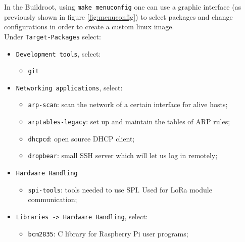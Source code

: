 In the Buildroot, using \verb|make menuconfig| one can use a graphic interface (as previously shown in figure \ref{fig:menuconfig}) to select packages and change configurations in order to create a custom linux image.\\

Under \verb|Target-Packages| select:
\begin{itemize}
	\item \verb|Development tools|, select:
	\begin{itemize}
		\item \verb|git|
	\end{itemize}

	\item \verb|Networking applications|, select:
	\begin{itemize}
		\item \verb|arp-scan|: scan the network of a certain interface for alive hosts;
		\item \verb|arptables-legacy|: set up and maintain the tables of ARP rules;
		\item \verb|dhcpcd|: open source DHCP client;
		\item \verb|dropbear|: small SSH server which will let us log in remotely;
	\end{itemize}

	\item \verb|Hardware Handling|
	\begin{itemize}
		\item \verb|spi-tools|: tools needed to use SPI. Used for LoRa module communication;
	\end{itemize}
	
	\item \verb|Libraries -> Hardware Handling|, select:
	\begin{itemize}
		\item \verb|bcm2835|: C library for Raspberry Pi user programs;
	\end{itemize}
\end{itemize}